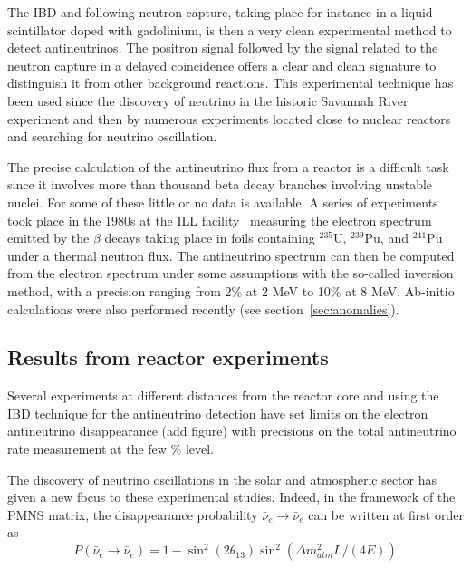 The IBD and following neutron capture, taking place for instance in a liquid scintillator doped with gadolinium, is then a very clean experimental method to detect antineutrinos. The positron signal followed by the signal related to the neutron capture in a delayed coincidence offers a clear and clean signature to distinguish it from other background reactions. This experimental technique has been used since the discovery of neutrino in the historic Savannah River experiment \cite{reines56} and then by numerous experiments located close to nuclear reactors and searching for neutrino oscillation.

The precise calculation of the antineutrino flux from a reactor is a difficult task since it involves more than thousand beta decay branches involving unstable nuclei. For some of these little or no data is available. A series of experiments took place in the 1980s at the ILL facility~\cite{ILL1,ILL2,ILL3} measuring the electron spectrum emitted by the $\beta$ decays taking place in foils containing $^{235}$U, $^{239}$Pu, and $^{241}$Pu under a thermal neutron flux. The antineutrino spectrum can then be computed from the electron spectrum under some assumptions with the so-called inversion method, with a precision ranging from 2\% at 2 MeV to 10\% at 8 MeV. Ab-initio calculations were also performed recently (see section~\ref{sec:anomalies}).   

\subsection{Results from reactor experiments}

Several experiments at different distances from the reactor core and using the IBD technique for the antineutrino detection have set limits on the electron antineutrino disappearance (add figure) with precisions on the total antineutrino rate measurement at the few \% level.

The discovery of neutrino oscillations in the solar and atmospheric sector has given a new focus to these experimental studies. Indeed, in the framework of the PMNS matrix, the disappearance probability $\bar \nu_e \rightarrow \bar \nu_e$
can be written at first order as 
\begin{equation}
P (\bar \nu_e \rightarrow \bar \nu_e) = 1 -\sin^2 (2 \theta_{13}) \sin^2 (\Delta m^2_{atm} L/(4 E)) 
\end{equation}

